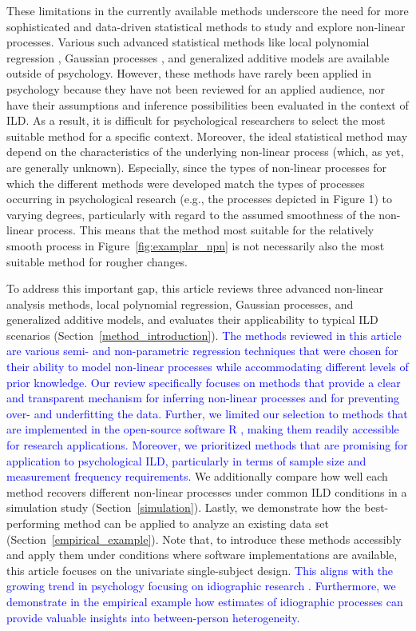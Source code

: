 \documentclass[man, floatsintext]{apa7}
\begin{document}
These limitations in the currently available methods underscore the need for
more sophisticated and data-driven statistical methods to study and explore
non-linear processes. Various such advanced statistical methods like local
polynomial regression \parencite{fan_local_2018}, Gaussian processes
\parencite{rasmussen_gaussian_2006}, and generalized additive models
\parencite{wood_generalized_2006} are available outside of psychology. However,
these methods have rarely been applied in psychology because they have not been
reviewed for an applied audience, nor have their assumptions and inference
possibilities been evaluated in the context of ILD\@. As a result, it is
difficult for psychological researchers to select the most suitable method for
a specific context. Moreover, the ideal statistical method may depend on the
characteristics of the underlying non-linear process (which, as yet,  are
generally unknown). Especially, since the types of non-linear processes for
which the different methods were developed match the types of processes
occurring in psychological research (e.g., the processes depicted in Figure 1)
to varying degrees, particularly with regard to the assumed smoothness of the
non-linear process. This means that the method most suitable for the relatively
smooth process in Figure~\ref{fig:examplar_npn} is not necessarily
also the most suitable method for rougher changes.

To address this important gap, this article reviews three advanced non-linear
analysis methods, local polynomial regression, Gaussian processes, and
generalized additive models, and evaluates their applicability to typical ILD
scenarios (Section~\ref{method_introduction}). \textcolor{blue}{ The methods
  reviewed in this article are various semi- and non-parametric regression
  techniques that were chosen for their ability to model non-linear processes
  while accommodating different levels of prior knowledge. Our review
  specifically focuses on methods that provide a clear and transparent
  mechanism
  for inferring non-linear processes and for preventing over- and underfitting
  the
  data. Further, we limited our selection to methods that are implemented
  in
  the open-source software R \parencite{R-base}, making them readily accessible
  for research applications. Moreover, we prioritized methods that are
  promising
  for application to psychological ILD, particularly in terms of sample size
  and
  measurement frequency requirements.} We additionally compare how well each
method recovers different non-linear processes under common ILD conditions in a
simulation study (Section~\ref{simulation}). Lastly, we demonstrate how the
best-performing method can be applied to analyze an existing data set
(Section~\ref{empirical_example}). Note that, to introduce these methods
accessibly and apply them under conditions where software implementations are
available, this article focuses on the univariate single-subject design.
\textcolor{blue}{ This aligns with the growing trend in psychology focusing on
  idiographic research
  \parencite[e.g.,][]{klaassen_all_2018,
    molenaar_manifesto_2004,hamaker_why_2012}.
  Furthermore, we demonstrate in the empirical example how estimates of
  idiographic processes can provide valuable insights into between-person
  heterogeneity.}
\end{document}
